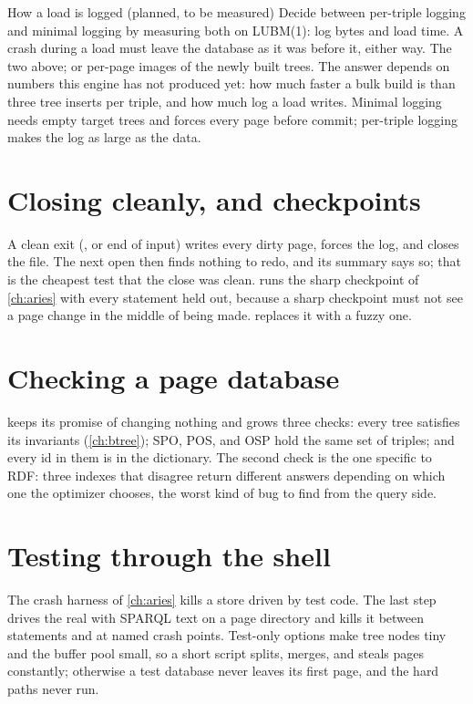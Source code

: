 \begin{decision}{How a load is logged (planned, to be measured)}
 Decide between per-triple logging and minimal logging by
measuring both on LUBM(1): log bytes and load time. A crash during a load must
leave the database as it was before it, either way.
 The two above; or per-page images of the newly built
trees.
 The answer depends on numbers this engine has not produced yet:
how much faster a bulk build is than three tree inserts per triple, and how
much log a load writes.
 Minimal logging needs empty target trees and forces every page
before commit; per-triple logging makes the log as large as the data.
\end{decision}

\section{Closing cleanly, and checkpoints}

A clean exit (, or end of input) writes every dirty
page, forces the log, and closes the file. The next open then finds nothing to
redo, and its summary says so; that is the cheapest test that the close was
clean.  runs the sharp checkpoint of
\cref{ch:aries} with every statement held out, because a sharp checkpoint must
not see a page change in the middle of being made.  replaces
it with a fuzzy one.

\section{Checking a page database}

 keeps its promise of changing nothing and grows
three checks: every tree satisfies its invariants (\cref{ch:btree}); SPO, POS,
and OSP hold the same set of triples; and every id in them is in the
dictionary. The second check is the one specific to RDF: three indexes that
disagree return different answers depending on which one the optimizer
chooses, the worst kind of bug to find from the query side.

\section{Testing through the shell}

The crash harness of \cref{ch:aries} kills a store driven by test code. The
last step drives the real  with SPARQL text on a page directory
and kills it between statements and at named crash points. Test-only options
make tree nodes tiny and the buffer pool small, so a short script splits,
merges, and steals pages constantly; otherwise a test database never leaves its
first page, and the hard paths never run.

